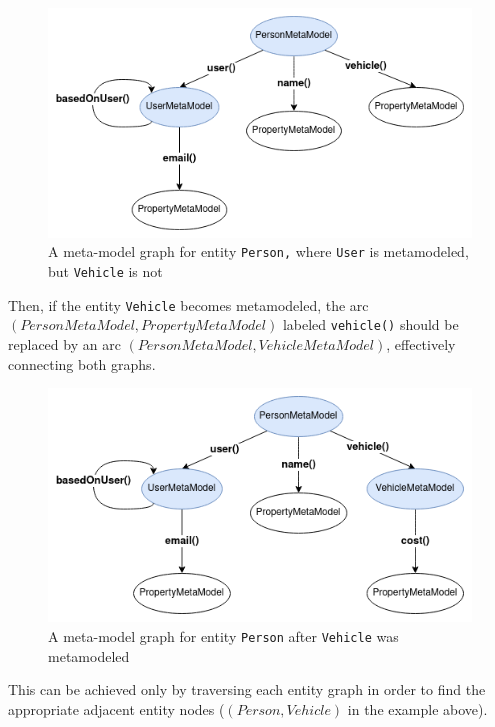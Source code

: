 \begin{enumerate}[label={\textbf{(\arabic*)*}}]
        \begin{figure}[H]\centering
            \includegraphics[scale=0.65]{images/meta-model-graph.drawio.png}
            \caption{A meta-model graph for entity \texttt{Person,} where \texttt{User} is metamodeled, but \texttt{Vehicle} is not}\label{fig:meta-model_graph}
        \end{figure}

    Then, if the entity \texttt{Vehicle} becomes metamodeled, the arc $(PersonMetaModel, PropertyMetaModel)$ labeled \texttt{vehicle()} should be replaced by an arc $(PersonMetaModel, VehicleMetaModel)$, effectively connecting both graphs.


        \begin{figure}[H]\centering
            \includegraphics[scale=0.65]{images/meta-model-graph1.drawio.png}
            \caption{A meta-model graph for entity \texttt{Person} after \texttt{Vehicle} was metamodeled}\label{fig:meta-model_graph1}
        \end{figure}

    This can be achieved only by traversing each entity graph in order to find the appropriate adjacent entity nodes ($(Person, Vehicle)$ in the example above).
\end{enumerate}

